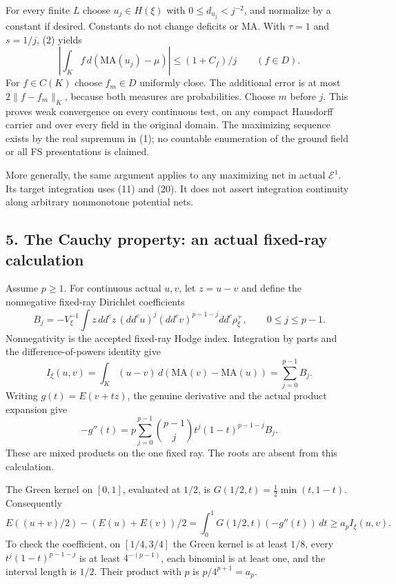 \documentclass[
  10pt,
]{article}
\begin{document}
For every finite \(L\) choose \(u_j\in H(\xi)\) with
\(0\leq d_{u_j}<j^{-2}\), and normalize by a constant if desired.
Constants do not change deficits or MA. With \(\tau=1\) and \(s=1/j\),
(2) yields \[
 \left|\int_Kf\,d(\mathrm{MA}(u_j)-\mu)\right|
                         \leq(1+C_f)/j\qquad(f\in D).                 \tag{22}
\] For \(f\in C(K)\) choose \(f_m\in D\) uniformly close. The additional
error is at most \(2\|f-f_m\|_K\), because both measures are
probabilities. Choose \(m\) before \(j\). This proves weak convergence
on every continuous test, on any compact Hausdorff carrier and over
every field in the original domain. The maximizing sequence exists by
the real supremum in (1); no countable enumeration of the ground field
or all FS presentations is claimed.

More generally, the same argument applies to any maximizing net in
actual \(\mathcal E^1\). Its target integration uses (11) and (20). It
does not assert integration continuity along arbitrary nonmonotone
potential nets.

\subsection{5. The Cauchy property: an actual fixed-ray
calculation}\label{the-cauchy-property-an-actual-fixed-ray-calculation}

Assume \(p\geq1\). For continuous actual \(u,v\), let \(z=u-v\) and
define the nonnegative fixed-ray Dirichlet coefficients \[
 B_j=-V_\xi^{-1}\int z\,dd^cz\,(dd^cu)^j(dd^cv)^{p-1-j}dd^c\rho_\xi^+,
                      \qquad 0\leq j\leq p-1.                        \tag{23}
\] Nonnegativity is the accepted fixed-ray Hodge index. Integration by
parts and the difference-of-powers identity give \[
 I_\xi(u,v)=\int_K(u-v)\,d(\mathrm{MA}(v)-\mathrm{MA}(u))
                          =\sum_{j=0}^{p-1}B_j.                      \tag{24}
\] Writing \(g(t)=E(v+tz)\), the genuine derivative and the actual
product expansion give \[
 -g''(t)=p\sum_{j=0}^{p-1}{p-1\choose j}t^j(1-t)^{p-1-j}B_j.           \tag{25}
\] These are mixed products on the one fixed ray. The roots are absent
from this calculation.

The Green kernel on \([0,1]\), evaluated at \(1/2\), is
\(G(1/2,t)=\tfrac12\min(t,1-t)\). Consequently \[
 E((u+v)/2)-(E(u)+E(v))/2
       =\int_0^1G(1/2,t)(-g''(t))\,dt\geq a_p I_\xi(u,v).             \tag{26}
\] To check the coefficient, on \([1/4,3/4]\) the Green kernel is at
least \(1/8\), every \(t^j(1-t)^{p-1-j}\) is at least \(4^{-(p-1)}\),
each binomial is at least one, and the interval length is \(1/2\). Their
product with \(p\) is \(p/4^{p+1}=a_p\).
\end{document}
